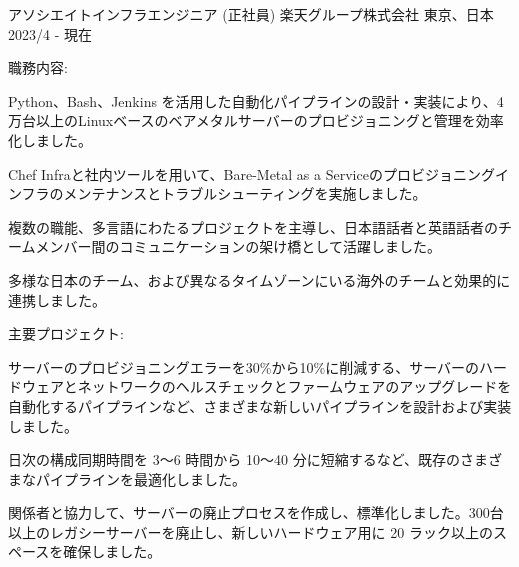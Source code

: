 

\begin{cventries}

  \cventry
    {アソシエイトインフラエンジニア (正社員)} %
    {楽天グループ株式会社} %
    {東京、日本} %
    {2023/4 - 現在} %
    {
      \begin{cvjobdesc} %
        \vspace{2.0mm}
        職務内容:
        \begin{cvbullets}
        \item {Python、Bash、Jenkins を活用した自動化パイプラインの設計・実装により、4万台以上のLinuxベースのベアメタルサーバーのプロビジョニングと管理を効率化しました。}
        \item {Chef Infraと社内ツールを用いて、Bare-Metal as a Serviceのプロビジョニングインフラのメンテナンスとトラブルシューティングを実施しました。}
        \item {複数の職能、多言語にわたるプロジェクトを主導し、日本語話者と英語話者のチームメンバー間のコミュニケーションの架け橋として活躍しました。}
        \item {多様な日本のチーム、および異なるタイムゾーンにいる海外のチームと効果的に連携しました。}
        \end{cvbullets}
        \vspace{2.0mm}
        主要プロジェクト:
        \begin{cvbullets}
        \item {サーバーのプロビジョニングエラーを30\%から10\%に削減する、サーバーのハードウェアとネットワークのヘルスチェックとファームウェアのアップグレードを自動化するパイプラインなど、さまざまな新しいパイプラインを設計および実装しました。}
        \item {日次の構成同期時間を 3～6 時間から 10～40 分に短縮するなど、既存のさまざまなパイプラインを最適化しました。}
        \item {関係者と協力して、サーバーの廃止プロセスを作成し、標準化しました。300台以上のレガシーサーバーを廃止し、新しいハードウェア用に 20 ラック以上のスペースを確保しました。}
        \end{cvbullets}
      \end{cvjobdesc}
    }


\end{cventries}
